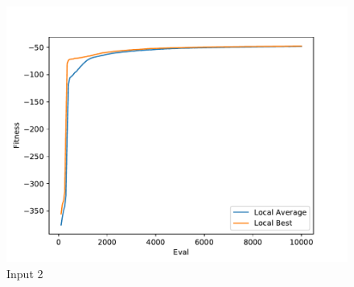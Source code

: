\documentclass{standalone}
\begin{document}
\begin{figure}[!htb]
	\caption{Input 2}
	\label{fig:graph_2046}
	\includegraphics[width=\textwidth]{../graphs/graphs/2046.pdf}
\end{figure}
\end{document}
